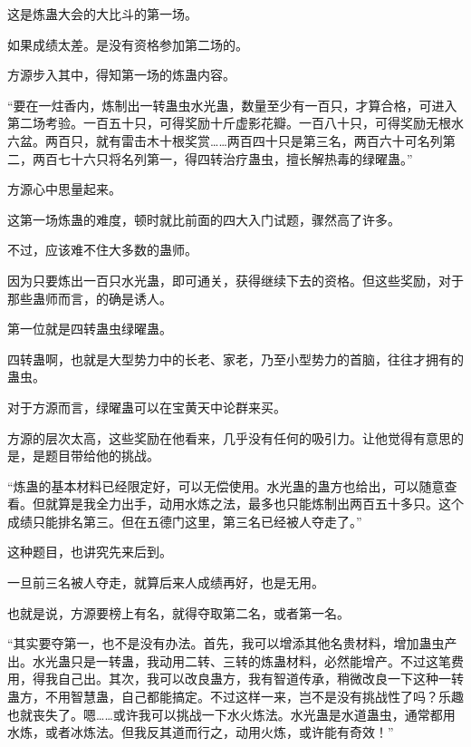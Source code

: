\begin{this_body}
这是炼蛊大会的大比斗的第一场。

如果成绩太差。是没有资格参加第二场的。

方源步入其中，得知第一场的炼蛊内容。

“要在一炷香内，炼制出一转蛊虫水光蛊，数量至少有一百只，才算合格，可进入第二场考验。一百五十只，可得奖励十斤虚影花瓣。一百八十只，可得奖励无根水六盆。两百只，就有雷击木十根奖赏……两百四十只是第三名，两百六十可名列第二，两百七十六只将名列第一，得四转治疗蛊虫，擅长解热毒的绿曜蛊。”

方源心中思量起来。

这第一场炼蛊的难度，顿时就比前面的四大入门试题，骤然高了许多。

不过，应该难不住大多数的蛊师。

因为只要炼出一百只水光蛊，即可通关，获得继续下去的资格。但这些奖励，对于那些蛊师而言，的确是诱人。

第一位就是四转蛊虫绿曜蛊。

四转蛊啊，也就是大型势力中的长老、家老，乃至小型势力的首脑，往往才拥有的蛊虫。

对于方源而言，绿曜蛊可以在宝黄天中论群来买。

方源的层次太高，这些奖励在他看来，几乎没有任何的吸引力。让他觉得有意思的是，是题目带给他的挑战。

“炼蛊的基本材料已经限定好，可以无偿使用。水光蛊的蛊方也给出，可以随意查看。但就算是我全力出手，动用水炼之法，最多也只能炼制出两百五十多只。这个成绩只能排名第三。但在五德门这里，第三名已经被人夺走了。”

这种题目，也讲究先来后到。

一旦前三名被人夺走，就算后来人成绩再好，也是无用。

也就是说，方源要榜上有名，就得夺取第二名，或者第一名。

“其实要夺第一，也不是没有办法。首先，我可以增添其他名贵材料，增加蛊虫产出。水光蛊只是一转蛊，我动用二转、三转的炼蛊材料，必然能增产。不过这笔费用，得我自己出。其次，我可以改良蛊方，我有智道传承，稍微改良一下这种一转蛊方，不用智慧蛊，自己都能搞定。不过这样一来，岂不是没有挑战性了吗？乐趣也就丧失了。嗯……或许我可以挑战一下水火炼法。水光蛊是水道蛊虫，通常都用水炼，或者冰炼法。但我反其道而行之，动用火炼，或许能有奇效！”

\end{this_body}

